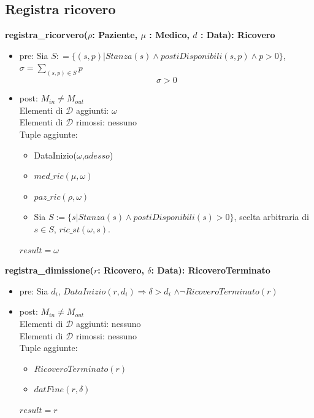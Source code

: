 \documentclass[12pt, letterpaper]{article}
\begin{document}
\subsection{Registra ricovero}
    \textbf{registra\_ricorvero($\rho$: Paziente, $\mu$ : Medico, $d$ : Data): Ricovero}
    \begin{itemize}
        \item pre: Sia $S : =\{(s,p) | Stanza(s)\land postiDisponibili(s,p)\land p>0 \}$, $\displaystyle\sigma = \sum_{(s,p)\in S} p$\\
        $$\sigma > 0$$
        \item post: $M_{in} \neq M_{out}$\\
        Elementi di $\mathcal{D}$ aggiunti: $\omega$\\
        Elementi di $\mathcal{D}$ rimossi: nessuno \\
        Tuple aggiunte:
        \begin{itemize}
            \item DataInizio($\omega$,$adesso$)
            \item $med\_ric(\mu,\omega)$
            \item $paz\_ric(\rho, \omega)$
            \item Sia $S:=\{s | Stanza(s) \land postiDisponibili(s)>0\}$, scelta arbitraria di $s\in S$, $ric\_st(\omega, s)$.
        \end{itemize}
        $result = \omega$
    \end{itemize}

    \textbf{registra\_dimissione($r$: Ricovero, $\delta$: Data): RicoveroTerminato}
    \begin{itemize}
        \item pre:  Sia $d_i$, $DataInizio(r,d_i)\Rightarrow \delta>d_i$ $\land \lnot RicoveroTerminato(r)$
        \item post: $M_{in}\neq M_{out}$\\
        Elementi di $\mathcal{D}$ aggiunti: nessuno\\
        Elementi di $\mathcal{D}$ rimossi: nessuno \\
        Tuple aggiunte:
        \begin{itemize}
            \item $RicoveroTerminato(r)$
            \item $datFine(r,\delta)$
        \end{itemize}
        $result = r$
    \end{itemize}
\end{document}
